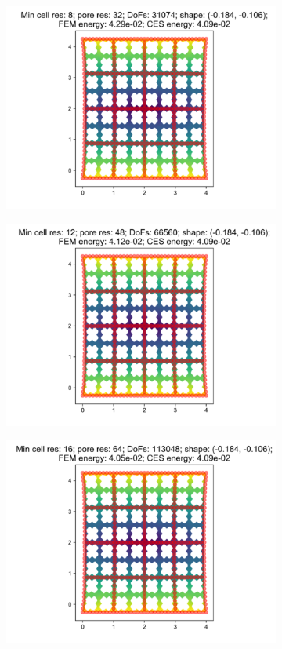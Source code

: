 \begin{figure}[H]
\begin{subfigure}{.45\textwidth}
\end{subfigure}
\begin{subfigure}{.45\textwidth}
  \centering
  \includegraphics[width=.8\linewidth]{lces/vis_tension/bm_2_mesh_3.png}
\end{subfigure}
\newline
\begin{subfigure}{.45\textwidth}
  \centering
  \includegraphics[width=.8\linewidth]{lces/vis_tension/bm_2_mesh_4.png}
\end{subfigure}
\begin{subfigure}{.45\textwidth}
  \centering
  \includegraphics[width=.8\linewidth]{lces/vis_tension/bm_2_mesh_5.png}
\end{subfigure}
\end{figure}


